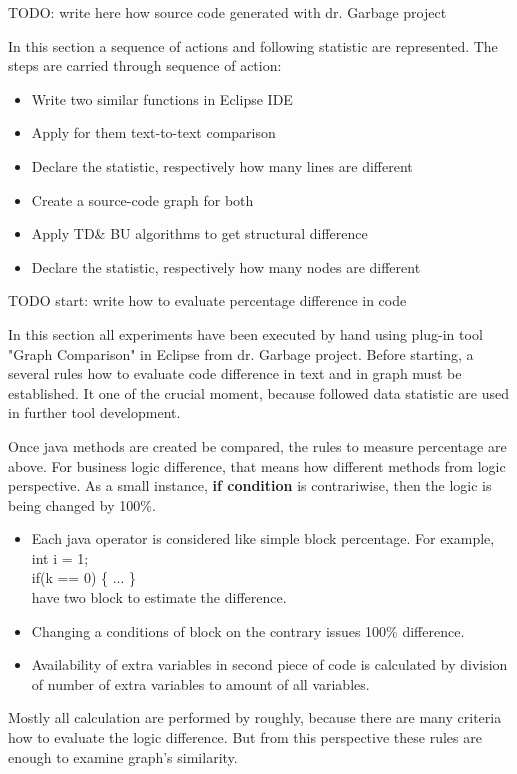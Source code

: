 \documentclass{report}
\begin{document}
TODO: write here how source code generated with dr. Garbage project

In this section a sequence of actions and following statistic are represented. The steps are carried through sequence of action:
\begin{itemize}
	\item Write two similar functions in Eclipse IDE
	\item Apply for them text-to-text comparison
	\item Declare the statistic, respectively how many lines are different		
	\item Create a source-code graph for both
	\item Apply TD\& BU algorithms to get structural difference	
	\item Declare the statistic, respectively how many nodes are different			
\end{itemize}

TODO start: write how to evaluate percentage difference in code

In this section all experiments have been executed by hand using plug-in tool "Graph Comparison" in Eclipse from dr. Garbage project. Before starting, a several rules how to evaluate code difference in text and in graph must be established. It one of the crucial moment, because followed data statistic are used in further tool development.

Once java methods are created be compared, the rules to measure percentage are above.
For business logic difference, that means how different methods from logic perspective. As a small instance, \textbf{if condition} is contrariwise, then the logic is being changed by 100\%.
\begin{itemize}
	\item Each java operator is considered like simple block percentage. For example, 
	int i = 1; 	\\
	if(k == 0) \{ ... \} \\
	have two block to estimate the difference.
	\item Changing a conditions of block on the contrary issues 100\% difference.
	\item Availability of extra variables in second piece of code is calculated by division of 
	number of extra variables to amount of all variables.
\end{itemize}
Mostly all calculation are performed by roughly, because there are many criteria how to evaluate the logic difference. But from this perspective these rules are enough to examine graph's similarity.
\end{document}
